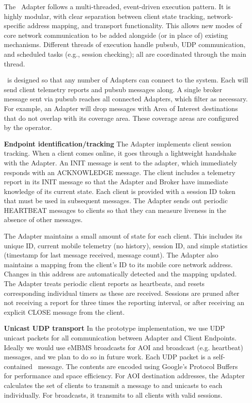 The \name~Adapter follows a multi-threaded, event-driven execution
pattern. It is highly modular, with clear separation between client
state tracking, network-specific address mapping, and transport
functionality.  This allows new modes of core network communication to
be added alongside (or in place of) existing mechanisms.  Different
threads of execution handle pubsub, UDP communication, and scheduled
tasks (e.g., session checking); all are coordinated through the main
thread.

\name~is designed so that any number of Adapters can connect to the
\pubsub system. Each will send client telemetry reports and pubsub
messages along. A single broker message sent via pubsub reaches all
connected Adapters, which filter as necessary. For example, an Adapter
will drop messages with Area of Interest destinations that do not
overlap with its coverage area. These coverage areas are configured by
the operator.
  
\textbf{Endpoint identification/tracking} The Adapter implements
client session tracking. When a client comes online, it goes through a
lightweight handshake with the Adapter. An INIT message is sent to the
adapter, which immediately responds with an ACKNOWLEDGE message. The
client includes a telemetry report in its INIT message so that the
Adapter and Broker have immediate knowledge of its current state. Each
client is provided with a session ID token that must be used in
subsequent messages.  The Adapter sends out periodic HEARTBEAT
messages to clients so that they can measure liveness in the absence
of other messages.

The Adapter maintains a small amount of state for each client. This
includes its unique ID, current mobile telemetry (no history), session
ID, and simple statistics (timestamp for last message received,
message count). The Adapter also maintains a mapping from the client's
ID to its mobile core network address. Changes in this address are
automatically detected and the mapping updated. The Adapter treats
periodic client reports as heartbeats, and resets corresponding
individual timers as these are received. Sessions are pruned after not
receiving a report for three times the reporting interval, or after
receiving an explicit CLOSE message from the client.

\textbf{Unicast UDP transport} In the prototype implementation, we use
UDP unicast packets for all communication between Adapter and Client
Endpoints. Ideally we would use eMBMS broadcasts for AOI and broadcast
(e.g. heartbeat) messages, and we plan to do so in future work. Each
UDP packet is a self-contained \name~message. The contents are
encoded using Google's Protocol Buffers~\cite{buffers2011google} for
performance and space efficiency. For AOI destination addresses, the
Adapter calculates the set of clients to transmit a message to and
unicasts to each individually. For broadcasts, it transmits to all
clients with valid sessions.

